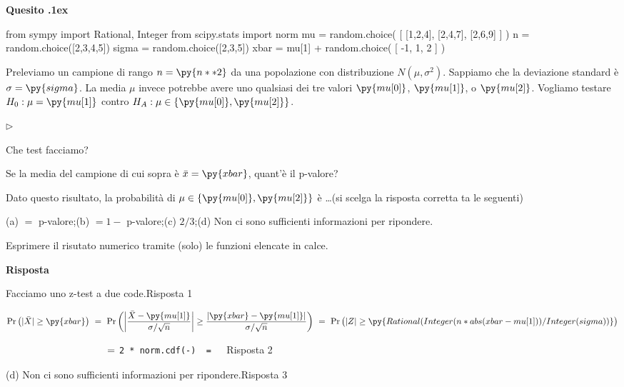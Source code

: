 \documentclass[11pt,twoside,a4paper]{article}
\newcommand{\mylabel}[1]{#1\hfill}
\renewenvironment{itemize}
  {\begin{list}{$\triangleright$}{%
   \setlength{\parskip}{0mm}
   \setlength{\topsep}{.4\baselineskip}
   \setlength{\rightmargin}{0mm}
   \setlength{\listparindent}{0mm}
   \setlength{\itemindent}{0mm}
   \setlength{\labelwidth}{2ex}
   \setlength{\itemsep}{.4\baselineskip}
   \setlength{\parsep}{0mm}
   \setlength{\partopsep}{0mm}
   \setlength{\labelsep}{1ex}
   \setlength{\leftmargin}{\labelwidth+\labelsep}
   \let\makelabel\mylabel}}{%
   \end{list}\vspace*{-1.3mm}}
\def\Pr{{\rm Pr\,}}
\newcounter{quesito}
\newenvironment{question}{\bigskip\addtocounter{quesito}{1}\par\textbf{Quesito \thequesito.\kern1ex}}{\vspace{\parskip}}
\newenvironment{answer}{\par\textbf{Risposta\quad}}{\vspace{\parskip}}
\begin{document}
\begin{question} %
\begin{pycode}
from sympy import Rational, Integer
from scipy.stats import norm
mu = random.choice( [ [1,2,4], [2,4,7], [2,6,9] ] ) 
n = random.choice([2,3,4,5])
sigma = random.choice([2,3,5])
xbar = mu[1] + random.choice( [ -1, 1, 2 ] ) 
\end{pycode}
Preleviamo un campione di rango $n=\py{n**2}$ da una popolazione con distribuzione $N(\mu,\sigma^2)$. Sappiamo che la deviazione standard è $\sigma=\py{sigma}$. La media $\mu$ invece potrebbe avere uno qualsiasi dei tre valori $\py{mu[0]}$, $\py{mu[1]}$, o $\py{mu[2]}$. 
Vogliamo testare $H_0:\mu=\py{mu[1]}$ contro $H_A:\mu\in\{\py{mu[0]},\py{mu[2]}\}$.
\begin{itemize}
\item[1.] Che test facciamo?
\item[2.] Se la media del campione di cui sopra è $\bar x=\py{xbar}$, quant'è il p-valore?
\item[3.] Dato questo risultato, la probabilità di $\mu\in\{\py{mu[0]},\py{mu[2]}\}$ è \ldots (si scelga la risposta corretta ta le seguenti)\medskip

(a) $=$ p-valore;\hfill (b) $=1-$ p-valore;\hfill (c) $2/3$;\hfill (d) Non ci sono sufficienti informazioni per ripondere.
\end{itemize}

Esprimere il risutato numerico tramite (solo) le funzioni elencate in calce.
\begin{answer}

{\color{blue}Facciamo uno z-test a due code.\hfill Risposta 1}

$\Pr\big(|\bar X|\ge\py{xbar}\big)\ =\ \Pr\bigg(\bigg|\dfrac{\bar X-\py{mu[1]}}{\sigma/\sqrt{n}}\bigg|\ge\dfrac{|\py{xbar}-\py{mu[1]}| }{\sigma/\sqrt{n} }\bigg)\ =\ \Pr\big(|Z|\ge\py{Rational(Integer(n*abs(xbar-mu[1]) ) / Integer(sigma) ) }\big)$

$\phantom{\Pr\big(|\bar X|\ge\py{xbar}\big)}\ =\ ${\color{blue}\tt 2 * norm.cdf(-) }{\tt\ =  \  }{\color{blue}\hfill Risposta 2}

\medskip
{\color{blue}(d) Non ci sono sufficienti informazioni per ripondere.\hfill Risposta 3}

\end{answer}
\end{question}
\end{document}
